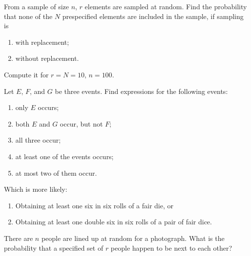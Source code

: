 \begin{problem}[Handout 1, \# 9]
  From a sample of size \(n\), \(r\) elements are sampled at random. Find
  the probability that none of the \(N\) prespecified elements are included
  in the sample, if sampling is
  \begin{enumerate}[label=(\alph*)]
  \item with replacement;
  \item without replacement.
  \end{enumerate}
  Compute it for \(r=N=10\), \(n=100\).
\end{problem}
\begin{solution}
\end{solution}

\begin{problem}[Handout 1, \# 11]
  Let \(E\), \(F\), and \(G\) be three events. Find expressions for the
  following events:
  \begin{enumerate}[label=(\alph*),noitemsep]
  \item only \(E\) occurs;
  \item both \(E\) and \(G\) occur, but not \(F\);
  \item all three occur;
  \item at least one of the events occurs;
  \item at most two of them occur.
  \end{enumerate}
\end{problem}
\begin{solution}
\end{solution}
\newpage

\begin{problem}[Handout 1, \# 12]
  Which is more likely:
  \begin{enumerate}[label=(\alph*),noitemsep]
  \item Obtaining at least one six in six rolls of a fair die, or
  \item Obtaining at least one double six in six rolls of a pair of fair
    dice.
  \end{enumerate}
\end{problem}
\begin{solution}
\end{solution}

\begin{problem}[Handout 1, \# 13]
  There are \(n\) people are lined up at random for a photograph. What is
  the probability that a specified set of \(r\) people happen to be next to
  each other?
\end{problem}
\begin{solution}
\end{solution}

